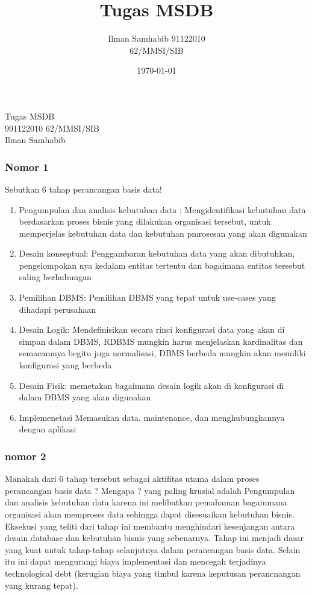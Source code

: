 \documentclass{article}
\title{Tugas MSDB}
\author{Ilman Samhabib 91122010\\62/MMSI/SIB}
\date{\today}
\begin{document}
\begin{center}
    Tugas MSDB    
    \\ 991122010 62/MMSI/SIB
    \\ Ilman Samhabib
\end{center}

\subsubsection*{Nomor 1}
Sebutkan 6 tahap  perancangan basis data!
\bigbreak
\begin{enumerate}
    \item Pengumpulan dan analisis kebutuhan data : Mengidentifikasi kebutuhan data berdasarkan proses bisnis yang dilakukan organisasi tersebut, untuk memperjelas kebutuhan  data dan kebutuhan pmrosesan yang akan digunakan
    \item Desain konseptual: Penggambaran kebutuhan data yang akan dibutuhkan, pengelompokan nya kedalam entitas tertentu dan bagaimana entitas tersebut saling berhubungan
    \item Pemilihan DBMS: Pemilihan DBMS yang tepat untuk use-cases yang dihadapi perusahaan
    \item Desain Logik: Mendefinisikan secara rinci konfigurasi data yang akan di simpan dalam DBMS, RDBMS mungkin harus menjelaskan kardinalitas dan semacamnya begitu juga normalisasi, DBMS berbeda mungkin akan memiliki konfigurasi yang berbeda 
    \item Desain Fisik:  memetakan bagaimana desain logik akan di konfigurasi di dalam DBMS yang akan digunakan
    \item Implemenetasi Memasukan data. maintenance, dan menghubungkannya dengan aplikasi
\end{enumerate}
\subsubsection*{nomor 2}
Manakah dari 6 tahap tersebut sebagai aktifitas utama dalam proses perancangan basis data ? Mengapa ?
\bigbreak
yang paling krusial adalah Pengumpulan dan analisis kebutuhan data karena ini melibatkan pemahaman  bagainmana organisasi akan memproses data sehingga dapat disesuaikan kebutuhan bisnis. Eksekusi yang teliti dari tahap ini membantu menghindari kesenjangan antara desain database dan kebutuhan bisnis yang sebenarnya. Tahap ini menjadi dasar yang kuat untuk tahap-tahap selanjutnya dalam perancangan basis data. Selain itu  ini dapat mengurangi biaya implementasi dan mencegah terjadinya technological debt (kerugian biaya yang timbul karena keputusan perancnangan yang kurang tepat).
\end{document}
